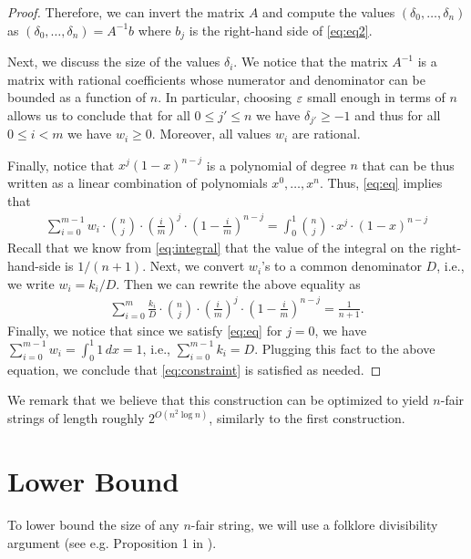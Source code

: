 \documentclass{article}
\begin{document}
\begin{proof}
Therefore, we can invert the matrix $A$ and compute the values $(\delta_0, \dots, \delta_n)$ as $(\delta_0, \dots, \delta_n) = A^{-1} b$ where $b_j$ is the right-hand side of \cref{eq:eq2}. 

Next, we discuss the size of the values $\delta_i$. We notice that the matrix $A^{-1}$ is a matrix with rational coefficients whose numerator and denominator can be bounded as a function of $n$. In particular, choosing $\varepsilon$ small enough in terms of $n$ allows us to conclude that for all $0 \le j' \le n$ we have $\delta_{j'} \ge -1$ and thus for all $0 \le i < m$ we have $w_i \ge 0$. Moreover, all values $w_i$ are rational. 

Finally, notice that $x^j(1-x)^{n-j}$ is a polynomial of degree $n$ that can be thus written as a linear combination of polynomials $x^0, \dots, x^n$. Thus, \cref{eq:eq} implies that
\begin{align}
    \label{eq:almost}
        \sum_{i = 0}^{m-1}  w_i \cdot \binom{n}{j} \cdot \left( \frac{i}{m} \right)^j \cdot\left( 1 - \frac{i}{m}\right)^{n-j}
    = \int_0^1 \binom{n}{j} \cdot x^j \cdot\left( 1 - x\right)^{n-j}
\end{align}
Recall that we know from \cref{eq:integral} that the value of the integral on the right-hand-side is $1/(n+1)$. Next, we convert $w_i$'s to a common denominator $D$, i.e., we write $w_i = k_i/D$. Then we can rewrite the above equality as
    \begin{align}
    \sum_{i = 0}^m  \frac{k_i}{D} \cdot \binom{n}{j} \cdot \left( \frac{i}{m} \right)^j \cdot\left( 1 - \frac{i}{m}\right)^{n-j}
    = \frac{1}{n+1}.
\end{align}
Finally, we notice that since we satisfy \cref{eq:eq} for $j = 0$, we have $\sum_{i = 0}^{m-1} w_i = \int_0^1 1 \,dx = 1$, i.e., $\sum_{i = 0}^{m-1} k_i = D$. Plugging this fact to the above equation, we conclude that \cref{eq:constraint} is satisfied as needed. 
\end{proof}

We remark that we believe that this construction can be optimized to yield $n$-fair strings of length roughly $2^{O(n^2 \log n)}$, similarly to the first construction. 

\section{Lower Bound}
\label{sec:lower_bound}


To lower bound the size of any $n$-fair string, we will use a folklore divisibility argument (see e.g. Proposition 1 in \cite{purcell_improved}). 
\end{document}

